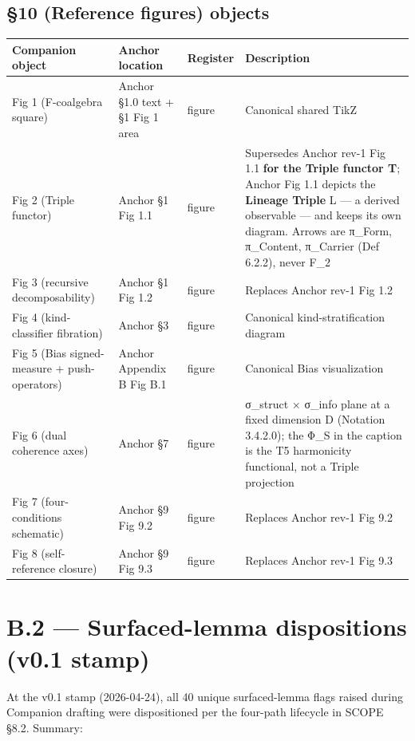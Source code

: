 \documentclass[11pt, openany]{book}
\newcommand{\sectionbreak}{\clearpage}
\begin{document}
\subsection{§10 (Reference figures) objects}

\begingroup\setlength{\tabcolsep}{3pt}\renewcommand{\arraystretch}{1.15}\footnotesize
\begin{center}
\begin{tabular}{p{0.53in} p{0.52in} p{0.52in} p{2.70in}}
\toprule
Companion object & Anchor location & Register & Description \\
\midrule
Fig 1 (F-coalgebra square) & Anchor §1.0 text + §1 Fig 1 area & figure & Canonical shared TikZ \\
Fig 2 (Triple functor) & Anchor §1 Fig 1.1 & figure & Supersedes Anchor rev-1 Fig 1.1 \textbf{for the Triple functor T}; Anchor Fig 1.1 depicts the \textbf{Lineage Triple} L --- a derived observable --- and keeps its own diagram. Arrows are π\_\allowbreak{}Form, π\_\allowbreak{}Content, π\_\allowbreak{}Carrier (Def 6.2.2), never F\_\allowbreak{}2 \\
Fig 3 (recursive decomposability) & Anchor §1 Fig 1.2 & figure & Replaces Anchor rev-1 Fig 1.2 \\
Fig 4 (kind-classifier fibration) & Anchor §3 & figure & Canonical kind-stratification diagram \\
Fig 5 (Bias signed-measure + push-operators) & Anchor Appendix B Fig B.1 & figure & Canonical Bias visualization \\
Fig 6 (dual coherence axes) & Anchor §7 & figure & σ\_\allowbreak{}struct × σ\_\allowbreak{}info plane at a fixed dimension D (Notation 3.4.2.0); the Φ\_\allowbreak{}S in the caption is the T5 harmonicity functional, not a Triple projection \\
Fig 7 (four-conditions schematic) & Anchor §9 Fig 9.2 & figure & Replaces Anchor rev-1 Fig 9.2 \\
Fig 8 (self-reference closure) & Anchor §9 Fig 9.3 & figure & Replaces Anchor rev-1 Fig 9.3 \\
\bottomrule
\end{tabular}
\end{center}
\endgroup
\sectionbreak

\section{B.2 --- Surfaced-lemma dispositions (v0.1 stamp)}

At the v0.1 stamp (2026-04-24), all 40 unique surfaced-lemma flags raised during Companion drafting were dispositioned per the four-path lifecycle in SCOPE §8.2. Summary:
\end{document}
